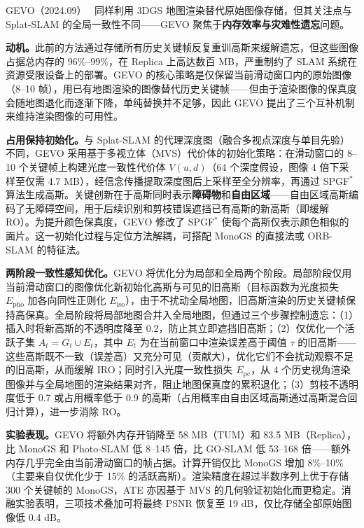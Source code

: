 GEVO（2024.09）~\cite{2409_09295} 同样利用 3DGS 地图渲染替代原始图像存储，但其关注点与 Splat-SLAM 的全局一致性不同——GEVO 聚焦于\textbf{内存效率与灾难性遗忘}问题。

\textbf{动机。}此前的方法通过存储所有历史关键帧反复重训高斯来缓解遗忘，但这些图像占据总内存的 96\%--99\%，在 Replica 上高达数百 MB，严重制约了 SLAM 系统在资源受限设备上的部署。GEVO 的核心策略是仅保留当前滑动窗口内的原始图像（8--10 帧），用已有地图渲染的图像替代历史关键帧——但由于渲染图像的保真度会随地图退化而逐渐下降，单纯替换并不足够，因此 GEVO 提出了三个互补机制来维持渲染图像的可用性。

\textbf{占用保持初始化。}与 Splat-SLAM 的代理深度图（融合多视点深度与单目先验）不同，GEVO 采用基于多视立体（MVS）代价体的初始化策略：在滑动窗口的 8--10 个关键帧上构建光度一致性代价体 $V(u,d)$（64 个深度假设，图像 4 倍下采样至仅需 4.7 MB），经信念传播提取深度图后上采样至全分辨率，再通过 SPGF$^*$ 算法生成高斯。关键创新在于高斯同时表示\textbf{障碍物}和\textbf{自由区域}——自由区域高斯编码了无障碍空间，用于后续识别和剪枝错误遮挡已有高斯的新高斯（即缓解 RO）。为提升颜色保真度，GEVO 修改了 SPGF$^*$ 使每个高斯仅表示颜色相似的面片。这一初始化过程与定位方法解耦，可搭配 MonoGS 的直接法或 ORB-SLAM 的特征法。

\textbf{两阶段一致性感知优化。}GEVO 将优化分为局部和全局两个阶段。局部阶段仅用当前滑动窗口的图像优化新初始化高斯与可见的旧高斯（目标函数为光度损失 $E_{\mathrm{pho}}$ 加各向同性正则化 $E_{\mathrm{iso}}$），由于不扰动全局地图，旧高斯渲染的历史关键帧保持高保真。全局阶段将局部地图合并入全局地图，但通过三个步骤控制遗忘：（1）插入时将新高斯的不透明度降至 0.2，防止其立即遮挡旧高斯；（2）仅优化一个活跃子集 $A_t = G_t \cup E_t$，其中 $E_t$ 为在当前窗口中渲染误差高于阈值 $\tau$ 的旧高斯——这些高斯既不一致（误差高）又充分可见（贡献大），优化它们不会扰动观察不足的旧高斯，从而缓解 IRO；同时引入光度一致性损失 $E_{\mathrm{pc}}$，从 4 个历史视角渲染图像并与全局地图的渲染结果对齐，阻止地图保真度的累积退化；（3）剪枝不透明度低于 0.7 或占用概率低于 0.9 的高斯（占用概率由自由区域高斯通过高斯混合回归计算），进一步消除 RO。

\textbf{实验表现。}GEVO 将额外内存开销降至 58 MB（TUM）和 83.5 MB（Replica），比 MonoGS 和 Photo-SLAM 低 8--145 倍，比 GO-SLAM 低 53--168 倍——额外内存几乎完全由当前滑动窗口的帧占据。计算开销仅比 MonoGS 增加 8\%--10\%（主要来自仅优化少于 15\% 的活跃高斯）。渲染精度在超过半数序列上优于存储 300 个关键帧的 MonoGS，ATE 亦因基于 MVS 的几何验证初始化而更稳定。消融实验表明，三项技术叠加可将最终 PSNR 恢复至 19 dB，仅比存储全部原始图像低 0.4 dB。

